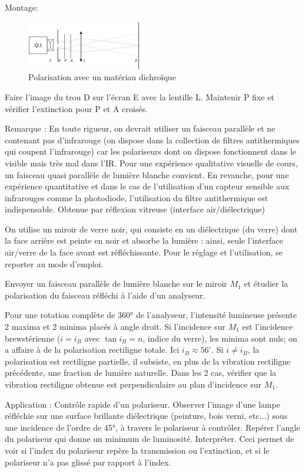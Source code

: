 \documentclass{article}%
\begin{document}
Montage:


\begin{figure}
	\centerline{\includegraphics[width=5cm]{images-exp/Polarrectdichro.png}}
	\caption{Polarisation avec un matériau dichroïque}
\end{figure}

Faire l'image du trou D sur l'écran E avec la lentille L. Maintenir P fixe et vérifier l'extinction pour P et A croisés.

Remarque : En toute rigueur, on devrait utiliser un faisceau parallèle et ne contenant pas d'infrarouge (on dispose dans la collection de filtres antithermiques qui coupent l'infrarouge) car les polariseurs dont on dispose fonctionnent dans le visible mais très mal dans l'IR. Pour une expérience qualitative visuelle de cours, un faisceau quasi parallèle de lumière blanche convient. En revanche, pour une expérience quantitative et dans le cas de l'utilisation d'un capteur sensible aux infrarouges comme la photodiode, l'utilisation du filtre antithermique est indispensable.
Obtenue par réflexion vitreuse (interface air/diélectrique)

On utilise un miroir de verre noir, qui consiste en un diélectrique (du verre) dont la face arrière est peinte en noir et absorbe la lumière : ainsi, seule l'interface air/verre de la face avant est réfléchissante. Pour le réglage et l'utilisation, se reporter au mode d'emploi.

Envoyer un faisceau parallèle de lumière blanche sur le miroir $M_{1}$ et étudier la polarisation du faisceau réfléchi à l'aide d'un analyseur.

Pour une rotation complète de 360° de l'analyseur, l'intensité lumineuse présente 2 maxima et 2 minima placés à angle droit. Si l'incidence sur $M_{1}$ est l'incidence brewstérienne ($i=i_B$ avec $\tan i_{B}=n$, indice du verre), les minima sont nuls; on a affaire à de la polarisation rectiligne totale. Ici $i_{B} \approx 56^{\circ}$. Si $i \ne i_{B }$, la polarisation est rectiligne partielle, il subsiste, en plus de la vibration rectiligne précédente, une fraction de lumière naturelle. Dans les 2 cas, vérifier que la vibration rectiligne obtenue est perpendiculaire au plan d'incidence sur $M_{1}$.

Application : Contrôle rapide d'un polariseur. Observer l'image d'une lampe réfléchie sur une surface brillante diélectrique (peinture, bois verni, etc...) sous une incidence de l'ordre de 45°, à travers le polariseur à contrôler. Repérer l'angle du polariseur qui donne un minimum de luminosité. Interpréter. Ceci permet de voir si l'index du polariseur repère la transmission ou l'extinction, et si le polariseur n'a pas glissé par rapport à l'index.
\end{document}
